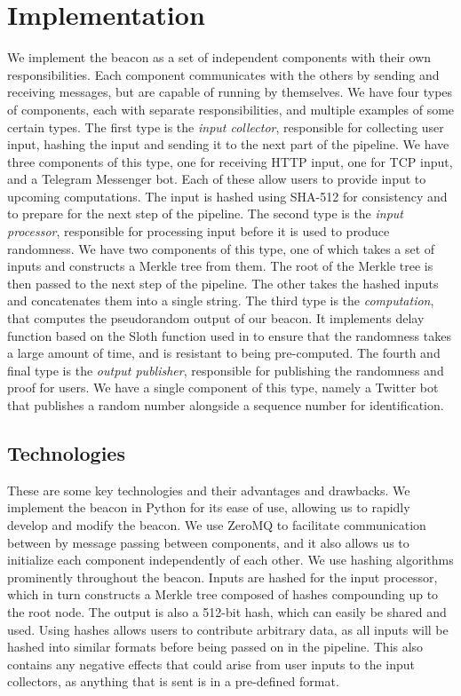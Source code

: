 \section{Implementation}
\label{sec:implementation}
We implement the beacon as  a set of independent components with their own responsibilities. Each component communicates with the others by sending and receiving messages, but are capable of running by themselves. We have four types of components, each with separate responsibilities, and multiple examples of some certain types.
The first type is the \emph{input collector}, responsible for collecting user input, hashing the input and sending it to the next part of the pipeline. We have three components of this type, one for receiving HTTP input, one for TCP input, and a Telegram Messenger bot. Each of these allow users to provide input to upcoming computations. The input is hashed using SHA-512 for consistency and to prepare for the next step of the pipeline.
The second type is the \emph{input processor}, responsible for processing input before it is used to produce randomness. We have two components of this type, one of which takes a set of inputs and constructs a Merkle tree from them. The root of the Merkle tree is then passed to the next step of the pipeline. The other takes the hashed inputs and concatenates them into a single string.
The third type is the \emph{computation}, that computes the pseudorandom output of our beacon. It implements delay function based on the Sloth function used in \cite{randomzoo} to ensure that the randomness takes a large amount of time, and is resistant to being pre-computed.
The fourth and final type is the \emph{output publisher}, responsible for publishing the randomness and proof for users. We have a single component of this type, namely a Twitter bot that publishes a random number alongside a sequence number for identification.

\subsection{Technologies}
\label{sub:technologies}
These are some key technologies and their advantages and drawbacks.
We implement the beacon in Python for its ease of use, allowing us to rapidly develop and modify the beacon. We use ZeroMQ to facilitate communication between by message passing between components, and it also allows us to initialize each component independently of each other. 
We use hashing algorithms prominently throughout the beacon. Inputs are hashed for the input processor, which in turn constructs a Merkle tree composed of hashes compounding up to the root node. The output is also a 512-bit hash, which can easily be shared and used. Using hashes allows users to contribute arbitrary data, as all inputs will be hashed into similar formats before being passed on in the pipeline. This also contains any negative effects that could arise from user inputs to the input collectors, as anything that is sent is in a pre-defined format.